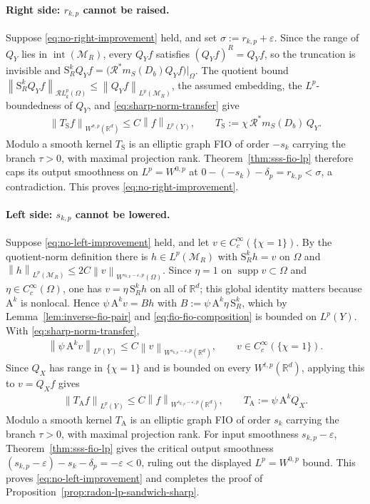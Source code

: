 \documentclass[12pt]{article}
\numberwithin{equation}{section}
\numberwithin{figure}{section}
\numberwithin{equation}{section}
\newcommand{\R}{\mathbb{R}}
\newcommand{\MR}{\mathcal M_R}
\newcommand{\norm}[1]{\left\|#1\right\|}
\DeclareMathOperator{\supp}{supp}
\begin{document}
\paragraph{Right side: $r_{k,p}$ cannot be raised.}
Suppose \eqref{eq:no-right-improvement} held, and set $\sigma:=r_{k,p}+\varepsilon$. Since the
range of $Q_Y$ lies in $\operatorname{int}(\MR)$, every $Q_Yf$ satisfies $(Q_Yf)^{R}=Q_Yf$, so
the truncation is invisible and $\mathrm S^k_RQ_Yf=\bigl(\mathcal R^{*}m_S(D_b)Q_Yf\bigr)|_\Omega$.
The quotient bound $\norm{\mathrm S^k_RQ_Yf}_{\mathcal RL^p_k(\Omega)}\le\norm{Q_Yf}_{L^p(\MR)}$,
the assumed embedding, the $L^p$-boundedness of $Q_Y$, and \eqref{eq:sharp-norm-transfer} give
\begin{align*}
    \norm{T_{\mathrm S}f}_{W^{\sigma,p}(\R^d)}\le C\norm{f}_{L^p(Y)},
    \qquad
    T_{\mathrm S}:=\chi\,\mathcal R^{*}m_S(D_b)\,Q_Y .
\end{align*}
Modulo a smooth kernel $T_{\mathrm S}$ is an elliptic graph FIO of
order $-s_k$ carrying the branch $\tau>0$, with maximal projection rank.
Theorem~\ref{thm:sss-fio-lp} therefore caps its output smoothness on $L^p=W^{0,p}$ at
$0-(-s_k)-\delta_p=r_{k,p}<\sigma$, a contradiction. This proves \eqref{eq:no-right-improvement}.

\paragraph{Left side: $s_{k,p}$ cannot be lowered.}
Suppose \eqref{eq:no-left-improvement} held, and let $v\in C_c^\infty(\{\chi=1\})$. By the
quotient-norm definition there is $h\in L^p(\MR)$ with $\mathrm S^k_Rh=v$ on $\Omega$ and
$\norm{h}_{L^p(\MR)}\le 2C\norm{v}_{W^{s_{k,p}-\varepsilon,p}(\Omega)}$. Since $\eta=1$ on
$\supp v\subset\Omega$ and $\eta\in C_c^\infty(\Omega)$, one has $v=\eta\,\mathrm S^k_Rh$ on all
of $\R^d$; this global identity matters because $\mathrm A^k$ is nonlocal. Hence
$\psi\,\mathrm A^kv=Bh$ with $B:=\psi\,\mathrm A^k\eta\,\mathrm S^k_R$, which by
Lemma~\ref{lem:inverse-fio-pair} and \eqref{eq:fio-fio-composition} is bounded on $L^p(Y)$.
With \eqref{eq:sharp-norm-transfer},
\begin{align*}
    \norm{\psi\,\mathrm A^kv}_{L^p(Y)}\le C\norm{v}_{W^{s_{k,p}-\varepsilon,p}(\R^d)},
    \qquad v\in C_c^\infty(\{\chi=1\}).
\end{align*}
Since $Q_X$ has range in $\{\chi=1\}$ and is bounded on every $W^{t,p}(\R^d)$, applying this to
$v=Q_Xf$ gives
\begin{align*}
    \norm{T_{\mathrm A}f}_{L^p(Y)}\le C\norm{f}_{W^{s_{k,p}-\varepsilon,p}(\R^d)},
    \qquad
    T_{\mathrm A}:=\psi\,\mathrm A^kQ_X .
\end{align*}
Modulo a smooth kernel $T_{\mathrm A}$ is an elliptic graph FIO of order $s_k$ carrying the
branch $\tau>0$, with maximal projection rank. For input smoothness $s_{k,p}-\varepsilon$,
Theorem~\ref{thm:sss-fio-lp} gives the critical output smoothness
$(s_{k,p}-\varepsilon)-s_k-\delta_p=-\varepsilon<0$, ruling out the displayed
$L^p=W^{0,p}$ bound. This proves \eqref{eq:no-left-improvement} and completes the proof of
Proposition~\ref{prop:radon-lp-sandwich-sharp}.


\newpage


\end{document}
